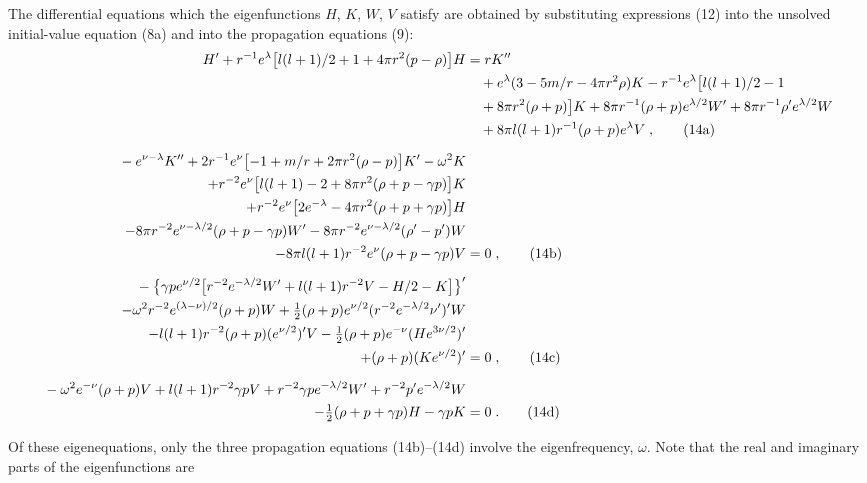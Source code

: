 The differential equations which the eigenfunctions $H$, $K$, $W$, $V$ satisfy are obtained
by substituting expressions (12) into the unsolved initial-value equation (8a) and into
the propagation equations (9):
\begin{align}
  H' + r^{-1}e^{\lambda}\bigl[l(l+1)/2 + 1 + 4\pi r^{2}(p - \rho)\bigr]H
  &= r K'' \notag \\
  &\quad + e^{\lambda}(3 - 5m/r - 4\pi r^{2}\rho)K
     - r^{-1}e^{\lambda}\bigl[l(l+1)/2 - 1 \notag \\
  &\quad + 8\pi r^{2}(\rho + p)\bigr]K
     + 8\pi r^{-1}(\rho + p)e^{\lambda/2}W'
     + 8\pi r^{-1}\rho' e^{\lambda/2}W \notag \\
  &\quad + 8\pi l(l+1)r^{-1}(\rho + p)e^{\lambda}V \;,
\label{eq:14a} \tag{14a}
\\[6pt]
  {}-e^{\nu-\lambda}K''
  + 2r^{-1}e^{\nu}\bigl[-1 + m/r + 2\pi r^{2}(\rho - p)\bigr]K'
  - \omega^{2}K
  &\notag \\
  + r^{-2}e^{\nu}\bigl[l(l+1) - 2 + 8\pi r^{2}(\rho + p - \gamma p)\bigr]K
  &\notag \\
  + r^{-2}e^{\nu}\bigl[2e^{-\lambda} - 4\pi r^{2}(\rho + p + \gamma p)\bigr]H
  &\notag \\
  - 8\pi r^{-2}e^{\nu-\lambda/2}(\rho + p - \gamma p)W'
  - 8\pi r^{-2}e^{\nu-\lambda/2}(\rho' - p')W
  &\notag \\
  - 8\pi l(l+1)r^{-2}e^{\nu}(\rho + p - \gamma p)V
  &= 0 \;,
\label{eq:14b} \tag{14b}
\\[6pt]
  {}-\bigl\{\gamma p e^{\nu/2}\bigl[r^{-2}e^{-\lambda/2}W'
    + l(l+1)r^{-2}V - H/2 - K\bigr]\bigr\}'
  &\notag \\
  - \omega^{2}r^{-2}e^{(\lambda-\nu)/2}(\rho + p)W
  + \tfrac{1}{2}(\rho + p)e^{\nu/2}(r^{-2}e^{-\lambda/2}\nu')'W
  &\notag \\
  - l(l+1)r^{-2}(\rho + p)(e^{\nu/2})'V
  - \tfrac{1}{2}(\rho + p)e^{-\nu}(He^{3\nu/2})'
  &\notag \\
  + (\rho + p)(Ke^{\nu/2})'
  &= 0 \;,
\label{eq:14c} \tag{14c}
\\[6pt]
  {}-\omega^{2}e^{-\nu}(\rho + p)V
  + l(l+1)r^{-2}\gamma p V
  + r^{-2}\gamma p e^{-\lambda/2}W'
  + r^{-2}p' e^{-\lambda/2}W
  &\notag \\
  - \tfrac{1}{2}(\rho + p + \gamma p)H - \gamma p K
  &= 0 \;.
\label{eq:14d} \tag{14d}
\end{align}

Of these eigenequations, only the three propagation equations (14b)--(14d) involve the
eigenfrequency, $\omega$. Note that the real and imaginary parts of the eigenfunctions are
